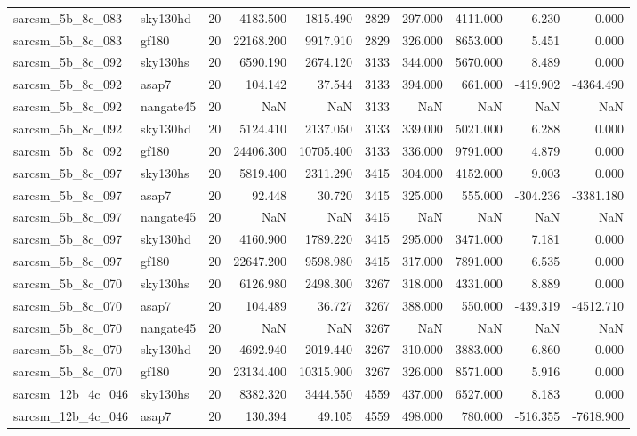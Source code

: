 \begin{longtable}{llrrrrrrrr}
sarcsm\_5b\_8c\_083 & sky130hd & 20 & 4183.500 & 1815.490 & 2829 & 297.000 & 4111.000 & 6.230 & 0.000 \\
sarcsm\_5b\_8c\_083 & gf180 & 20 & 22168.200 & 9917.910 & 2829 & 326.000 & 8653.000 & 5.451 & 0.000 \\
sarcsm\_5b\_8c\_092 & sky130hs & 20 & 6590.190 & 2674.120 & 3133 & 344.000 & 5670.000 & 8.489 & 0.000 \\
sarcsm\_5b\_8c\_092 & asap7 & 20 & 104.142 & 37.544 & 3133 & 394.000 & 661.000 & -419.902 & -4364.490 \\
sarcsm\_5b\_8c\_092 & nangate45 & 20 & NaN & NaN & 3133 & NaN & NaN & NaN & NaN \\
sarcsm\_5b\_8c\_092 & sky130hd & 20 & 5124.410 & 2137.050 & 3133 & 339.000 & 5021.000 & 6.288 & 0.000 \\
sarcsm\_5b\_8c\_092 & gf180 & 20 & 24406.300 & 10705.400 & 3133 & 336.000 & 9791.000 & 4.879 & 0.000 \\
sarcsm\_5b\_8c\_097 & sky130hs & 20 & 5819.400 & 2311.290 & 3415 & 304.000 & 4152.000 & 9.003 & 0.000 \\
sarcsm\_5b\_8c\_097 & asap7 & 20 & 92.448 & 30.720 & 3415 & 325.000 & 555.000 & -304.236 & -3381.180 \\
sarcsm\_5b\_8c\_097 & nangate45 & 20 & NaN & NaN & 3415 & NaN & NaN & NaN & NaN \\
sarcsm\_5b\_8c\_097 & sky130hd & 20 & 4160.900 & 1789.220 & 3415 & 295.000 & 3471.000 & 7.181 & 0.000 \\
sarcsm\_5b\_8c\_097 & gf180 & 20 & 22647.200 & 9598.980 & 3415 & 317.000 & 7891.000 & 6.535 & 0.000 \\
sarcsm\_5b\_8c\_070 & sky130hs & 20 & 6126.980 & 2498.300 & 3267 & 318.000 & 4331.000 & 8.889 & 0.000 \\
sarcsm\_5b\_8c\_070 & asap7 & 20 & 104.489 & 36.727 & 3267 & 388.000 & 550.000 & -439.319 & -4512.710 \\
sarcsm\_5b\_8c\_070 & nangate45 & 20 & NaN & NaN & 3267 & NaN & NaN & NaN & NaN \\
sarcsm\_5b\_8c\_070 & sky130hd & 20 & 4692.940 & 2019.440 & 3267 & 310.000 & 3883.000 & 6.860 & 0.000 \\
sarcsm\_5b\_8c\_070 & gf180 & 20 & 23134.400 & 10315.900 & 3267 & 326.000 & 8571.000 & 5.916 & 0.000 \\
sarcsm\_12b\_4c\_046 & sky130hs & 20 & 8382.320 & 3444.550 & 4559 & 437.000 & 6527.000 & 8.183 & 0.000 \\
sarcsm\_12b\_4c\_046 & asap7 & 20 & 130.394 & 49.105 & 4559 & 498.000 & 780.000 & -516.355 & -7618.900 \\

\end{longtable}
